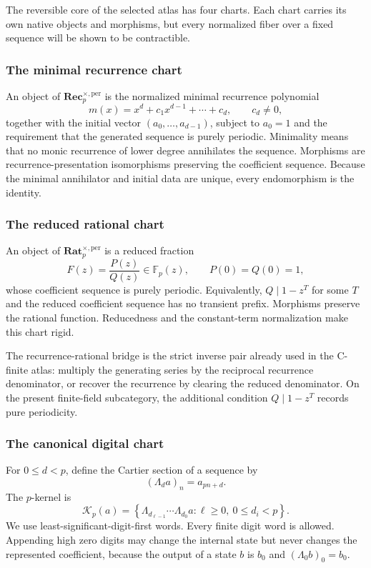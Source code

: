 \documentclass[11pt]{article}
\theoremstyle{definition}
\theoremstyle{remark}
\newcommand{\Rat}{\mathbf{Rat}}
\newcommand{\Rec}{\mathbf{Rec}}
\begin{document}
The reversible core of the selected atlas has four charts.  Each chart carries its own native objects and morphisms, but every normalized fiber over a fixed sequence will be shown to be contractible.

\subsubsection{The minimal recurrence chart}

An object of \(\Rec_p^{\times,\mathrm{per}}\) is the normalized minimal recurrence polynomial
\[
m(x)=x^d+c_1x^{d-1}+\cdots+c_d,
\qquad c_d\neq 0,
\]
together with the initial vector \((a_0,\ldots,a_{d-1})\), subject to \(a_0=1\) and the requirement that the generated sequence is purely periodic.  Minimality means that no monic recurrence of lower degree annihilates the sequence.  Morphisms are recurrence-presentation isomorphisms preserving the coefficient sequence.  Because the minimal annihilator and initial data are unique, every endomorphism is the identity.

\subsubsection{The reduced rational chart}

An object of \(\Rat_p^{\times,\mathrm{per}}\) is a reduced fraction
\[
F(z)=\frac{P(z)}{Q(z)}\in\mathbb F_p(z),
\qquad
P(0)=Q(0)=1,
\]
whose coefficient sequence is purely periodic.  Equivalently, \(Q\mid 1-z^T\) for some \(T\) and the reduced coefficient sequence has no transient prefix.  Morphisms preserve the rational function.  Reducedness and the constant-term normalization make this chart rigid.

The recurrence-rational bridge is the strict inverse pair already used in the C-finite atlas: multiply the generating series by the reciprocal recurrence denominator, or recover the recurrence by clearing the reduced denominator.  On the present finite-field subcategory, the additional condition \(Q\mid1-z^T\) records pure periodicity.

\subsubsection{The canonical digital chart}

For \(0\leq d<p\), define the Cartier section of a sequence by
\[
(\Lambda_da)_n=a_{pn+d}.
\]
The \(p\)-kernel is
\begin{equation}
\label{eq:p-kernel}
\mathcal K_p(a)
=
\left\{
\Lambda_{d_{\ell-1}}\cdots\Lambda_{d_0}a:
\ell\geq 0,\ 0\leq d_i<p
\right\}.
\end{equation}
We use least-significant-digit-first words.  Every finite digit word is allowed.  Appending high zero digits may change the internal state but never changes the represented coefficient, because the output of a state \(b\) is \(b_0\) and \((\Lambda_0b)_0=b_0\).
\end{document}
